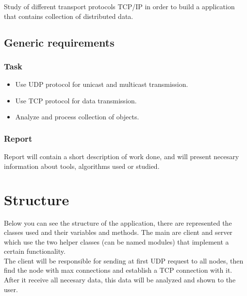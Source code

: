 \documentclass[12pt]{article}
\begin{document}
  Study of different transport protocols TCP/IP in order to build a application that contains collection of distributed data.

  \subsection{Generic requirements}

  \subsubsection{Task}

  \begin{itemize}
    \item Use UDP protocol for unicast and multicast transmission.
    \item Use TCP protocol for data transmission.
    \item Analyze and process collection of objects.
  \end{itemize}

  \subsubsection{Report}

  Report will contain a short description of work done, and will present necesary information
  about tools, algorithms used or studied.

  
  \section{Structure}

    Below you can see the structure of the application, there are represented the classes used 
    and their variables and methods. The main are client and server which use the two helper classes
    (can be named modules) that implement a certain functionality. \\

    The client will be responsible for sending at first UDP request to all nodes, then find the node with
    max connections and establish a TCP connection with it. After it receive all necesary data, this 
    data will be analyzed and shown to the user. \\ 
\end{document}
